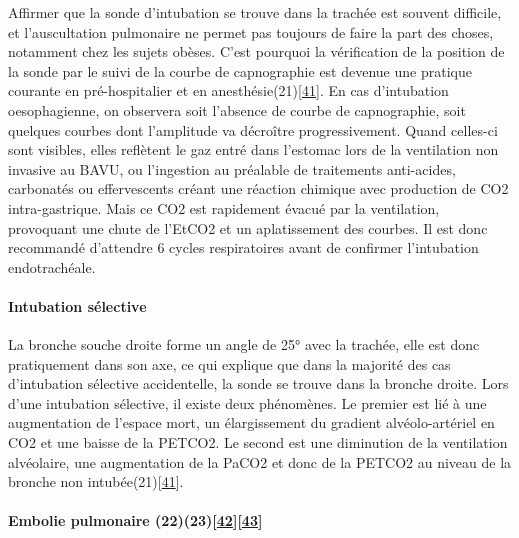 \documentclass[12pt,]{article}
\let\oldparagraph\paragraph
\renewcommand{\paragraph}[1]{\oldparagraph{#1}\mbox{}}
\begin{document}
Affirmer que la sonde d'intubation se trouve dans la trachée est souvent
difficile, et l'auscultation pulmonaire ne permet pas toujours de faire
la part des choses, notamment chez les sujets obèses. C'est pourquoi la
vérification de la position de la sonde par le suivi de la courbe de
capnographie est devenue une pratique courante en pré-hospitalier et en
anesthésie(21){[}\protect\hyperlink{ref-jung2008modalites}{41}{]}. En
cas d'intubation oesophagienne, on observera soit l'absence de courbe de
capnographie, soit quelques courbes dont l'amplitude va décroître
progressivement. Quand celles-ci sont visibles, elles reflètent le gaz
entré dans l'estomac lors de la ventilation non invasive au BAVU, ou
l'ingestion au préalable de traitements anti-acides, carbonatés ou
effervescents créant une réaction chimique avec production de CO2
intra-gastrique. Mais ce CO2 est rapidement évacué par la ventilation,
provoquant une chute de l'EtCO2 et un aplatissement des courbes. Il est
donc recommandé d'attendre 6 cycles respiratoires avant de confirmer
l'intubation endotrachéale.

\hypertarget{intubation-selective}{%
\paragraph{Intubation sélective}\label{intubation-selective}}

La bronche souche droite forme un angle de 25° avec la trachée, elle est
donc pratiquement dans son axe, ce qui explique que dans la majorité des
cas d'intubation sélective accidentelle, la sonde se trouve dans la
bronche droite. Lors d'une intubation sélective, il existe deux
phénomènes. Le premier est lié à une augmentation de l'espace mort, un
élargissement du gradient alvéolo-artériel en CO2 et une baisse de la
PETCO2. Le second est une diminution de la ventilation alvéolaire, une
augmentation de la PaCO2 et donc de la PETCO2 au niveau de la bronche
non intubée(21){[}\protect\hyperlink{ref-jung2008modalites}{41}{]}.

\hypertarget{embolie-pulmonaire-2223kline1998preliminarywiegand2000effectiveness}{%
\paragraph{\texorpdfstring{Embolie pulmonaire
(22)(23){[}\protect\hyperlink{ref-kline1998preliminary}{42}{]}{[}\protect\hyperlink{ref-wiegand2000effectiveness}{43}{]}}{Embolie pulmonaire (22)(23){[}42{]}{[}43{]}}}\label{embolie-pulmonaire-2223kline1998preliminarywiegand2000effectiveness}}
\end{document}
